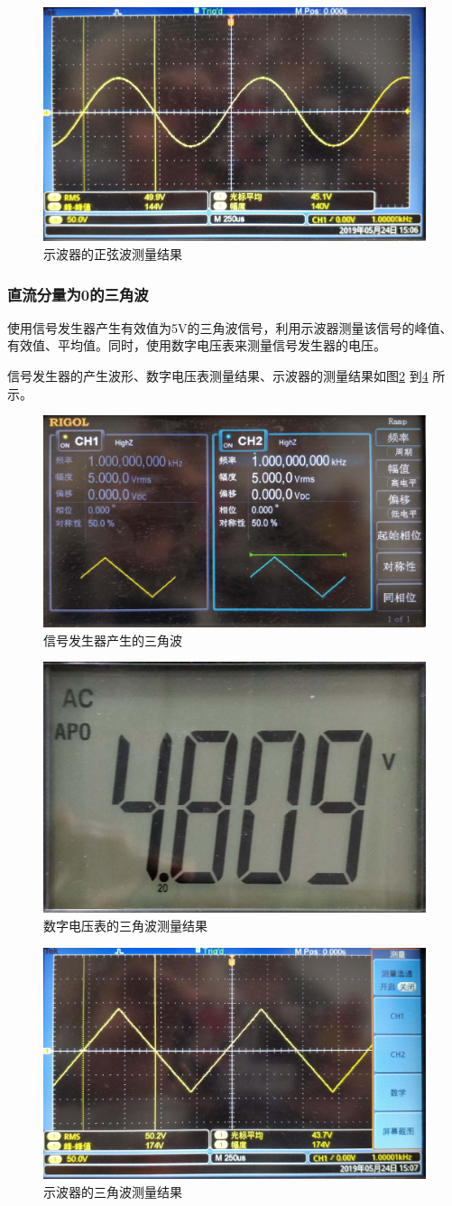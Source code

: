 \documentclass[12pt]{article}
\begin{document}
    \begin{figure}[htbp]
    \centering
    \includegraphics[width=.5\textwidth]{P029}
    \caption{示波器的正弦波测量结果}\label{dianyacelzxb3}
  \end{figure}
\subsubsection{直流分量为0的三角波}
使用信号发生器产生有效值为5V的三角波信号，利用示波器测量该信号的峰值、有效值、平均值。同时，使用数字电压表来测量信号发生器的电压。\par
信号发生器的产生波形、数字电压表测量结果、示波器的测量结果如图\ref{dianyacelsjb1}
到\ref{dianyacelsjb3}
所示。
\begin{figure}[htbp]
    \centering
    \includegraphics[width=.5\textwidth]{P028}
    \caption{信号发生器产生的三角波}\label{dianyacelsjb1}
  \end{figure}
  \begin{figure}[htbp]
    \centering
    \includegraphics[width=.5\textwidth]{P033}
    \caption{数字电压表的三角波测量结果}\label{dianyacelsjb2}
  \end{figure}
    \begin{figure}[htbp]
    \centering
    \includegraphics[width=.5\textwidth]{P019}
    \caption{示波器的三角波测量结果}\label{dianyacelsjb3}
  \end{figure}
\end{document}
